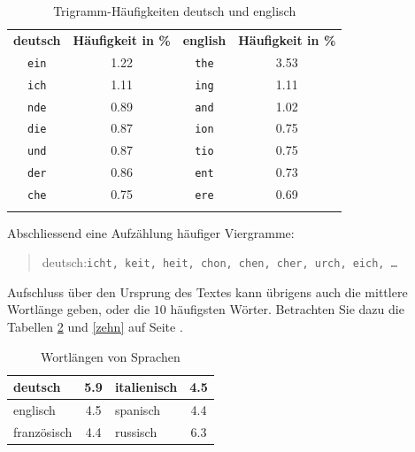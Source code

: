 \documentclass[%
11pt,%
twoside,%
titlepage,%
german,%
headsepline%
]{scrartcl}
\newcommand{\spaltenheight}{\rule{0mm}{3ex}}
\newcommand{\spaltensep}{\\[1ex]}
\begin{document}
\begin{table}
\begin{center}
\begin{tabular}{|c|c||c|c|}
\hhline{--||--}
\rowcolor{lightyellow}\spaltenheight \textbf{deutsch} &	\textbf{Häufigkeit in \%} &	\textbf{english} &	\textbf{Häufigkeit in \%}\spaltensep\hhline{--||--}
\rowcolor{Gray}\spaltenheight \texttt{ein}&	1.22&	\texttt{the}&	3.53\spaltensep\hhline{--||--}
\rowcolor{lightyellow}\spaltenheight \texttt{ich}&	1.11&	\texttt{ing}&	1.11\spaltensep\hhline{--||--}
\rowcolor{Gray}\spaltenheight \texttt{nde}&	0.89&	\texttt{and}& 1.02\spaltensep\hhline{--||--}
\rowcolor{lightyellow}\spaltenheight \texttt{die}&	0.87&	\texttt{ion}&	0.75\spaltensep\hhline{--||--}
\rowcolor{Gray}\spaltenheight \texttt{und}&	0.87&	\texttt{tio}&	0.75\spaltensep\hhline{--||--}
\rowcolor{lightyellow}\spaltenheight \texttt{der}&	0.86&	\texttt{ent}&	0.73\spaltensep\hhline{--||--}
\rowcolor{Gray}\spaltenheight \texttt{che}&	0.75&	\texttt{ere}&	0.69\spaltensep\hhline{--||--}
\end{tabular}
\end{center}
\caption{Trigramm-Häufigkeiten deutsch und englisch}\label{tab:trigramme}
\end{table}

Abschliessend eine Aufzählung häufiger Viergramme:
\begin{quote}
deutsch:\q \texttt{icht, keit, heit, chon, chen, cher, urch, eich, \dots}
\end{quote}

Aufschluss über den Ursprung des Textes kann übrigens auch die mittlere Wortlänge geben, oder die $10$ häufigsten Wörter. Betrachten Sie dazu die Tabellen \ref{wortlaenge} und \ref{zehn} auf Seite \pageref{wortlaenge}.

\begin{table}
\begin{center}
\begin{tabular}{|lc|lc|}
\hline
\rowcolor{Gray}\spaltenheight deutsch&	5.9&	italienisch& 4.5\spaltensep\hline
\rowcolor{lightyellow}\spaltenheight englisch&	4.5&	spanisch& 4.4\spaltensep\hline
\rowcolor{Gray}\spaltenheight französisch& 4.4& russisch& 6.3\spaltensep\hline
\end{tabular}
\end{center}
\caption{Wortlängen von Sprachen}\label{wortlaenge}
\end{table}
\end{document}
